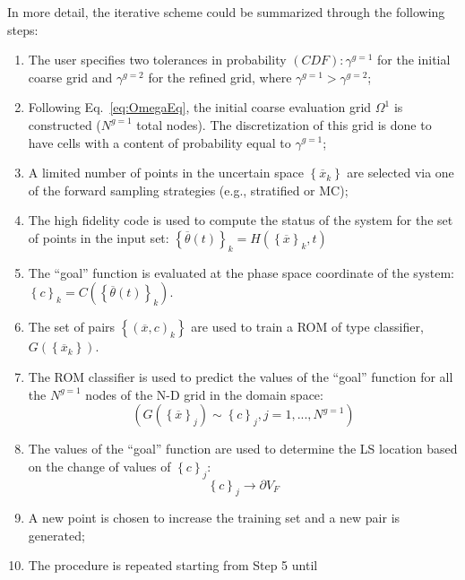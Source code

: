 In more detail, the iterative scheme could be summarized through the 
following steps:
\begin{enumerate}
  \item The user specifies two tolerances in probability $(CDF):
  \gamma^{g=1}$ for the initial coarse grid and $\gamma^{g=2}$
  for the refined grid, where  $ \gamma^{g=1} >  \gamma^{g=2}$;
  \item Following Eq.~\ref{eq:OmegaEq}, the initial coarse evaluation 
  grid $\Omega^{1}$ is constructed ($N^{g=1}$ total nodes). The 
  discretization of this grid is done to have cells with a content of 
  probability equal to $\gamma^{g=1}$;
  \item A limited number of points in the uncertain space $\left \{ 
  \overline{x}_{k} \right \}$ are selected via one of the forward 
  sampling strategies (e.g., stratified or MC);
  \item The high fidelity code is used to compute the status of the 
  system for the set of points in the input set: 
  $
  \left \{ \overline{\theta}(t)\right \}_{k} = H\left ( \left \{ \overline{x} \right 
  \}_{k},t \right )
  $
  \item The ``goal'' function is evaluated at the phase space coordinate 
  of the system:
  $\left \{ c \right \}_{k} = C\left ( \left \{ \overline{\theta}(t)\right \}_{k} 
  \right )$.
   \item The set of pairs $\left \{ \left ( \overline{x},c \right )_{k} \right \}$
   are used to train a ROM of type classifier, $G\left ( \left \{ 
   \overline{x}_{k} \right \} \right )$.
   \item The ROM classifier is used to predict the values of the ``goal''  
   function for all the $N^{g=1}$ nodes of the N-D grid in the domain 
   space:
   \begin{equation}
   \left (G\left ( \left \{ \overline{x} \right \}_{j} \right ) \sim \left \{ c \right 
   \}_{j}, j=1,...,N^{g=1}  \right )
    \end{equation}
    \item The values of the ``goal''  function are used to determine the 
    LS location based on the change of values of  $\left \{ c \right 
    \}_{j}$:
    \begin{equation}
    \left \{ c \right \}_{j}\rightarrow \partial V_{F}
     \end{equation}
     \item A new point is chosen to increase the training set and a new 
     pair is generated;     
     \item The procedure is repeated starting from Step 5 until 

\end{enumerate}
